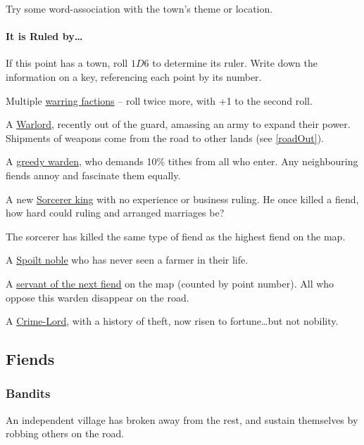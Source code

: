 \begin{multicols}{2}
Try some word-association with the town's theme or location.

\paragraph{It is Ruled by\ldots{}}

If this point has a town, roll $1D6$ to determine its ruler.
Write down the information on a key, referencing each point by its number.

\begin{dlist}
  \item
  Multiple \underline{warring factions} -- roll twice more, with +1 to the second roll.
  \item
  A \underline{Warlord}, recently out of the \gls{guard}, amassing an army to expand their power.
  Shipments of weapons come from the road to other lands
  (see \vref{roadOut}).
  \item
  A \underline{greedy \gls{warden}}, who demands 10\% tithes from all who enter.
  Any neighbouring fiends annoy and fascinate them equally.
  \item
  A new \underline{Sorcerer king} with no experience or business ruling.
  He once killed a fiend, how hard could ruling  and arranged marriages be?

  The sorcerer has killed the same type of fiend as the highest fiend on the map.
  \item
  A \underline{Spoilt noble} who has never seen a farmer in their life.
  \item
  A \underline{servant of the next fiend} on the map (counted by point number).
  All who oppose this \gls{warden} disappear on the road.
  \item
  A \underline{Crime-Lord}, with a history of theft, now risen to fortune\ldots but not nobility.
\end{dlist}

\subsection{Fiends}

\subsubsection{Bandits}
\label{banditsPoint}

An independent \gls{village} has broken away from the rest, and sustain themselves by robbing others on the road.


\end{multicols}
